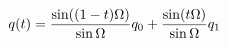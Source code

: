 \documentclass[preview]{standalone}
\begin{document}
\begin{align*}
\special{dvisvgm:raw <g id='unique000'>}q(t)=\frac{\sin((1-t)\Omega)}{\sin\Omega}q_0+\frac{\sin(t\Omega)}{\sin\Omega}q_1\special{dvisvgm:raw </g>}
\end{align*}
\end{document}
